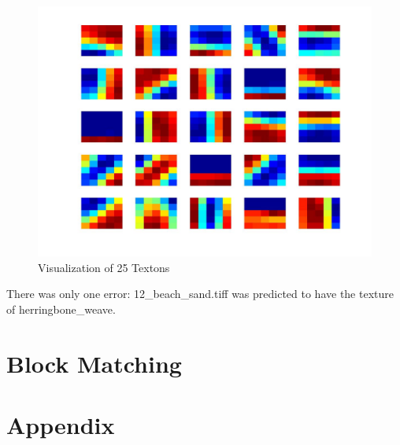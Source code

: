 \documentclass[11pt]{article}
\begin{document}
\begin{figure}[h!]
  \caption{Visualization of 25 Textons}
  \label{texton_viz}
  \centering
    \includegraphics[width=0.6\linewidth]{../textons/textons.jpg}
\end{figure}

There was only one error: 12\_beach\_sand.tiff was predicted to have the texture
of herringbone\_weave.

\section{Block Matching}


\section{Appendix}
\end{document}
